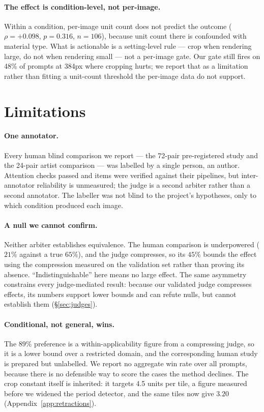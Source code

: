 \documentclass{article}
\begin{document}
\paragraph{The effect is condition-level, not per-image.} Within a condition,
per-image unit count does not predict the outcome
($\rho{=}+0.098$, $p{=}0.316$, $n{=}106$), because unit count there is
confounded with material type. What is actionable is a setting-level rule ---
crop when rendering large, do not when rendering small --- not a per-image
gate. Our gate still fires on 48\% of prompts at 384px where cropping hurts;
we report that as a limitation rather than fitting a unit-count threshold the
per-image data do not support.




\section{Limitations}
\label{startlimit}
\label{sec:limitations}

\paragraph{One annotator.} Every human blind comparison we report --- the
72-pair pre-registered study and the 24-pair artist comparison --- was
labelled by a single person, an author. Attention checks passed and items were
verified against their pipelines, but inter-annotator reliability is
unmeasured; the judge is a second arbiter rather than a second annotator.
The labeller was not blind to the project's hypotheses, only to which
condition produced each image.

\paragraph{A null we cannot confirm.} Neither arbiter establishes
equivalence. The human comparison is underpowered ($21\%$ against a true
$65\%$), and the judge compresses, so its $45\%$ bounds the effect using the
compression measured on the validation set rather than proving its absence.
``Indistinguishable'' here means no large effect. The same asymmetry constrains
every judge-mediated result: because our validated judge compresses effects,
its numbers support lower bounds and can refute nulls, but cannot establish
them (\S\ref{sec:judges}).

\paragraph{Conditional, not general, wins.} The $89\%$ preference is a
within-applicability figure from a compressing judge, so it is a lower bound
over a restricted domain, and the corresponding human study is prepared but
unlabelled. We report no aggregate win rate over all prompts, because there is
no defensible way to score the cases the method declines. The crop constant
itself is inherited: it targets 4.5 units per tile, a figure measured before
we widened the period detector, and the same tiles now give $3.20$
(Appendix~\ref{app:retractions}).
\end{document}
